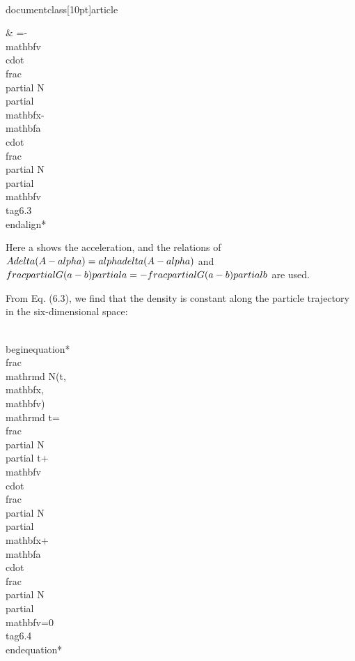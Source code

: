 \\documentclass[10pt]{article}
\begin{document}
{{{{& =-\\mathbf{v} \\cdot \\frac{\\partial N}{\\partial \\mathbf{x}}-\\mathbf{a} \\cdot \\frac{\\partial N}{\\partial \\mathbf{v}} \\tag{6.3}
\\end{align*}


Here a shows the acceleration, and the relations of $A \\delta(A-\\alpha)=\\alpha \\delta(A-\\alpha)$ and $\\frac{\\partial G(a-b)}{\\partial a}=-\\frac{\\partial G(a-b)}{\\partial b}$ are used.

From Eq. (6.3), we find that the density is constant along the particle trajectory in the six-dimensional space:


\\begin{equation*}
\\frac{\\mathrm{d} N(t, \\mathbf{x}, \\mathbf{v})}{\\mathrm{d} t}=\\frac{\\partial N}{\\partial t}+\\mathbf{v} \\cdot \\frac{\\partial N}{\\partial \\mathbf{x}}+\\mathbf{a} \\cdot \\frac{\\partial N}{\\partial \\mathbf{v}}=0 \\tag{6.4}
\\end{equation*}


}}}}
\end{document}
